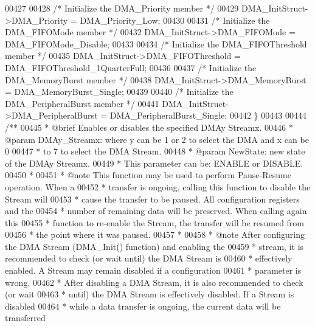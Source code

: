 \begin{DoxyCode}
00427 
00428   \textcolor{comment}{/* Initialize the DMA\_Priority member */}
00429   DMA\_InitStruct->DMA_Priority = DMA_Priority_Low;
00430 
00431   \textcolor{comment}{/* Initialize the DMA\_FIFOMode member */}
00432   DMA\_InitStruct->DMA_FIFOMode = DMA_FIFOMode_Disable;
00433 
00434   \textcolor{comment}{/* Initialize the DMA\_FIFOThreshold member */}
00435   DMA\_InitStruct->DMA_FIFOThreshold = DMA_FIFOThreshold_1QuarterFull;
00436 
00437   \textcolor{comment}{/* Initialize the DMA\_MemoryBurst member */}
00438   DMA\_InitStruct->DMA_MemoryBurst = DMA_MemoryBurst_Single;
00439 
00440   \textcolor{comment}{/* Initialize the DMA\_PeripheralBurst member */}
00441   DMA\_InitStruct->DMA_PeripheralBurst = DMA_PeripheralBurst_Single;
00442 \}
00443 
00444 \textcolor{comment}{/**}
00445 \textcolor{comment}{  * @brief  Enables or disables the specified DMAy Streamx.}
00446 \textcolor{comment}{  * @param  DMAy\_Streamx: where y can be 1 or 2 to select the DMA and x can be 0}
00447 \textcolor{comment}{  *         to 7 to select the DMA Stream.}
00448 \textcolor{comment}{  * @param  NewState: new state of the DMAy Streamx. }
00449 \textcolor{comment}{  *          This parameter can be: ENABLE or DISABLE.}
00450 \textcolor{comment}{  *}
00451 \textcolor{comment}{  * @note  This function may be used to perform Pause-Resume operation. When a}
00452 \textcolor{comment}{  *        transfer is ongoing, calling this function to disable the Stream will}
00453 \textcolor{comment}{  *        cause the transfer to be paused. All configuration registers and the}
00454 \textcolor{comment}{  *        number of remaining data will be preserved. When calling again this}
00455 \textcolor{comment}{  *        function to re-enable the Stream, the transfer will be resumed from}
00456 \textcolor{comment}{  *        the point where it was paused.          }
00457 \textcolor{comment}{  *    }
00458 \textcolor{comment}{  * @note  After configuring the DMA Stream (DMA\_Init() function) and enabling the}
00459 \textcolor{comment}{  *        stream, it is recommended to check (or wait until) the DMA Stream is}
00460 \textcolor{comment}{  *        effectively enabled. A Stream may remain disabled if a configuration }
00461 \textcolor{comment}{  *        parameter is wrong.}
00462 \textcolor{comment}{  *        After disabling a DMA Stream, it is also recommended to check (or wait}
00463 \textcolor{comment}{  *        until) the DMA Stream is effectively disabled. If a Stream is disabled }
00464 \textcolor{comment}{  *        while a data transfer is ongoing, the current data will be transferred}

\end{DoxyCode}
